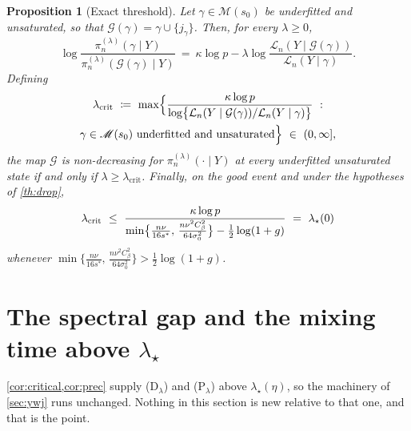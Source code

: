 \documentclass[aos]{imsart}
\newcommand{\gainfloorsm}{%
    \min\bigl\{\tfrac{n\nu}{16s^{\ast}},\,
    \tfrac{n\nu^{2}C_\beta^{2}}{64\sigma_0^{2}}\bigr\}}
\theoremstyle{plain}
\newtheorem{proposition}{Proposition}[section]
\theoremstyle{definition}
\begin{document}
    \begin{proposition}[Exact threshold]
        \label{prop:sharp}
        Let $\gamma\in\mathscr{M}(s_0)$ be underfitted and unsaturated, so
        that $\mathcal{G}(\gamma)=\gamma\cup\{j_\gamma\}$. Then, for every
        $\lambda\geq0$,
        \begin{equation}
            \label{eq:sharpid}
            \log\frac{\pi_n^{(\lambda)}(\gamma\mid Y)}
            {\pi_n^{(\lambda)}(\mathcal{G}(\gamma)\mid Y)}
            \ =\ \kappa\log p-\lambda
            \log\frac{\mathcal{L}_n(Y\mid\mathcal{G}(\gamma))}
            {\mathcal{L}_n(Y\mid\gamma)} .
        \end{equation}
         Defining
        \begin{multline}
            \label{eq:lambdacrit}
            \lambda_{\mathrm{crit}}\ \coloneq\
            \max\Bigl\{\frac{\kappa\log p}
            {\log\bigl\{\mathcal{L}_n(Y\mid\mathcal{G}(\gamma))/
            \mathcal{L}_n(Y\mid\gamma)\bigr\}}\ :\\
            \gamma\in\mathscr{M}(s_0)\ \text{underfitted and unsaturated}
            \Bigr\}\ \in\ (0,\infty],
        \end{multline}
        the map $\mathcal{G}$ is non-decreasing for
        $\pi_n^{(\lambda)}(\cdot\mid Y)$ at every underfitted unsaturated
        state if and only if $\lambda\geq\lambda_{\mathrm{crit}}$. Finally, on
        the good event and under the hypotheses of \cref{th:drop},
        \begin{equation}
            \label{eq:lambdacritbound}
            \lambda_{\mathrm{crit}}\ \leq\
            \frac{\kappa\log p}{\gainfloorsm-\tfrac12\log(1+g)}
            \ =\ \lambda_\star(0)
        \end{equation}
        whenever $\gainfloorsm>\tfrac12\log(1+g)$.
    \end{proposition}




    \section{The spectral gap and the mixing time above $\lambda_\star$}
    \label{sec:gap}

    \cref{cor:critical,cor:prec} supply (D$_\lambda$) and (P$_\lambda$)
    above $\lambda_\star(\eta)$, so the machinery of \cref{sec:ywj} runs
    unchanged. Nothing in this section is new relative to that one, and that
    is the point.
\end{document}
